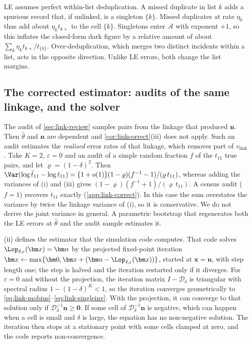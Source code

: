 \begin{remark}\label{rem:link-dedup}
LE assumes perfect within-list deduplication. A missed duplicate in list $k$ adds a spurious record that, if unlinked, is a singleton $\{k\}$. Missed duplicates at rate $\eta_k$ thus add about $\eta_kt_{k+}$ to the cell $\{k\}$. Singletons enter $\mathcal A$ with exponent $+1$, so this inflates the closed-form dark figure by a relative amount of about $\sum_k\eta_kt_{k+}/t_{\{k\}}$. Over-deduplication, which merges two distinct incidents within a list, acts in the opposite direction. Unlike LE errors, both change the list margins.
\end{remark}

\subsection{The corrected estimator: audits of the same linkage, and the solver}\label{app:link-correctdetails}

\begin{remark}\label{rem:link-sameaudit}
The audit of \cref{sec:link-review} samples pairs from the linkage that produced $\bm n$. Then $\hat\theta$ and $\bm n$ are dependent and \cref{cor:linkcorrect}(iii) does not apply. Such an audit estimates the \emph{realised} error rates of that linkage, which removes part of $v_{\mathrm{link}}$. Take $K=2$, $\varepsilon=0$ and an audit of a simple random fraction $f$ of the $t_{11}$ true pairs, and let $\varrho=(1-\delta)^2$. Then $\Var(\log\hat t_{11}-\log t_{11})=\{1+o(1)\}(1-\varrho)(f^{-1}-1)/(\varrho\,t_{11})$, whereas adding the variances of (i) and (iii) gives $(1-\varrho)(f^{-1}+1)/(\varrho\,t_{11})$. A census audit ($f=1$) recovers $t_{11}$ exactly (\cref{app:link-correct}). In this case the sum overstates the variance by twice the linkage variance of (i), so it is conservative. We do not derive the joint variance in general. A parametric bootstrap that regenerates both the LE errors at $\hat\theta$ and the audit sample estimates it.
\end{remark}

(ii) defines the estimator that the simulation code computes. That code solves $\Lop_{\delta,\varepsilon}(\bm x)=\bm n$ by the projected fixed-point iteration $\bm x\gets\max\{\bm 0,\bm x+(\bm n-\Lop_{\delta,\varepsilon}(\bm x))\}$, started at $\bm x=\bm n$, with step length one; the step is halved and the iteration restarted only if it diverges. For $\varepsilon=0$ and without the projection, the iteration matrix $I-\mathcal D_\delta$ is triangular with spectral radius $1-(1-\delta)^K<1$, so the iteration converges geometrically to \eqref{eq:link-mobius}--\eqref{eq:link-singleinv}. With the projection, it can converge to that solution only if $\mathcal D_\delta^{-1}\bm n\ge\bm0$. If some cell of $\mathcal D_\delta^{-1}\bm n$ is negative, which can happen when a cell is small and $\delta$ is large, the equation has no non-negative solution. The iteration then stops at a stationary point with some cells clamped at zero, and the code reports non-convergence.

